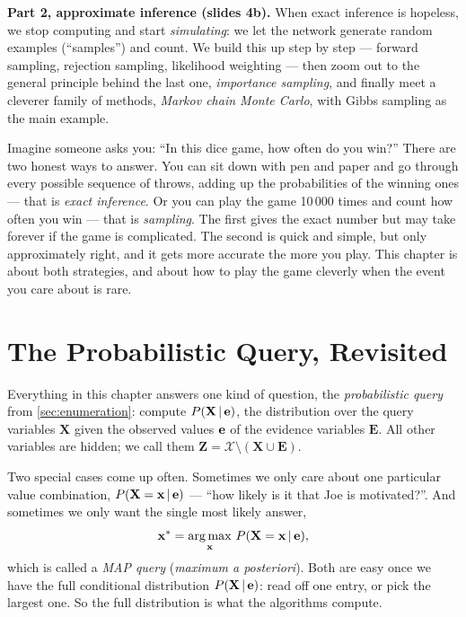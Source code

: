 \documentclass[11pt, oneside]{book}
\newcommand{\Prob}{\mathbb{P}}           %
\newcommand{\argmax}{\operatorname*{arg\,max}}
\newcommand{\given}{\,\vert\,}           %
\newcommand{\Xall}{\mathcal{X}}          %
\newcommand{\bX}{\mathbf{X}}  \newcommand{\bY}{\mathbf{Y}}
\newcommand{\bZ}{\mathbf{Z}}  \newcommand{\bE}{\mathbf{E}}
\newcommand{\bx}{\mathbf{x}}  \newcommand{\by}{\mathbf{y}}
\let\originalsection\section
\renewcommand{\section}{\Needspace{7\baselineskip}\originalsection}
\begin{document}
\textbf{Part 2, approximate inference (slides 4b).} When exact inference is
hopeless, we stop computing and start \emph{simulating}: we let the network
generate random examples (``samples'') and count. We build this up step by
step --- forward sampling, rejection sampling, likelihood weighting --- then
zoom out to the general principle behind the last one, \emph{importance
sampling}, and finally meet a cleverer family of methods, \emph{Markov chain
Monte Carlo}, with Gibbs sampling as the main example.

\begin{intbox}[unbreakable]
Imagine someone asks you: ``In this dice game, how often do you win?'' There
are two honest ways to answer. You can sit down with pen and paper and go
through every possible sequence of throws, adding up the probabilities of the
winning ones --- that is \emph{exact inference}. Or you can play the game
10\,000 times and count how often you win --- that is \emph{sampling}. The
first gives the exact number but may take forever if the game is complicated.
The second is quick and simple, but only approximately right, and it gets more
accurate the more you play. This chapter is about both strategies, and about
how to play the game cleverly when the event you care about is rare.
\end{intbox}

\section{The Probabilistic Query, Revisited}
\label{sec:query-revisited}

Everything in this chapter answers one kind of question, the
\emph{probabilistic query} from \cref{sec:enumeration}: compute
$P(\bX \given \be)$, the distribution over the query variables $\bX$ given the
observed values $\mathbf{e}$ of the evidence variables $\bE$. All other variables are
hidden; we call them $\bZ = \Xall \setminus (\bX \cup \bE)$.

Two special cases come up often. Sometimes we only care about one particular
value combination, $P(\bX = \bx \given \be)$ --- ``how likely is it that Joe
is motivated?''. And sometimes we only want the single most likely answer,
\[
\bx^* = \argmax_{\bx}\, P(\bX = \bx \given \be),
\]
which is called a \emph{MAP query} (\emph{maximum a posteriori}). Both are
easy once we have the full conditional distribution $P(\bX \given \be)$: read
off one entry, or pick the largest one. So the full distribution is what the
algorithms compute.
\end{document}
